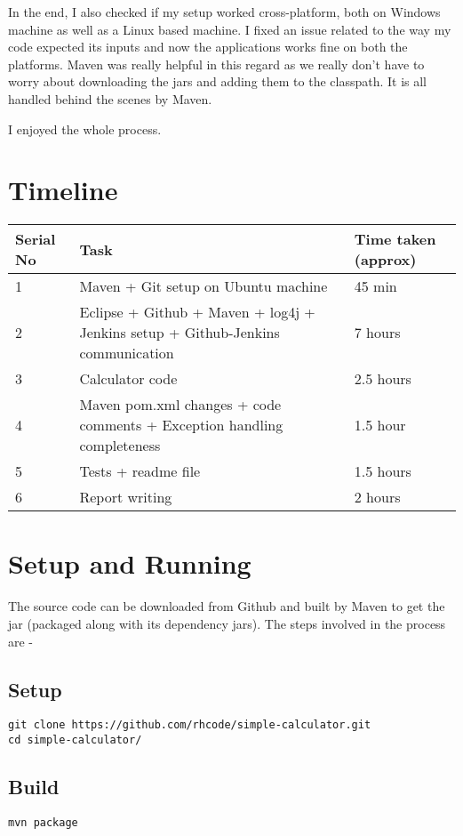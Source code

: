 \documentclass[12pt]{article}
\begin{document}
In the end, I also checked if my setup worked cross-platform, both on Windows machine as well as a Linux based machine. I fixed an issue related to the way my code expected its inputs and now the applications works fine on both the platforms. Maven was really helpful in this regard as we really don't have to worry about downloading the jars and adding them to the classpath. It is all handled behind the scenes by Maven. 

I enjoyed the whole process. 

\section{Timeline}
\begin{center}
\begin{tabular}{| p{1cm} | p{4in} | p{2cm} |}
\hline
Serial No & Task & Time taken (approx) \\ \hline
1 & Maven + Git setup on Ubuntu machine & 45 min \\ \hline
2 & Eclipse + Github + Maven + log4j + Jenkins setup + Github-Jenkins communication & 7 hours \\ \hline
3 & Calculator code & 2.5 hours \\ \hline
4 & Maven pom.xml changes + code comments + Exception handling completeness & 1.5 hour \\ \hline
5 & Tests + readme file & 1.5 hours \\ \hline
6 & Report writing & 2 hours \\
\hline
\end{tabular}
\end{center}

\section{Setup and Running}
The source code can be downloaded from Github and built by Maven to get the jar (packaged along with its dependency jars). The steps involved in the process are - 
\subsection{Setup}
\begin{verbatim}
git clone https://github.com/rhcode/simple-calculator.git
cd simple-calculator/
\end{verbatim}

\subsection{Build}
\begin{verbatim}
mvn package
\end{verbatim}
\end{document}
